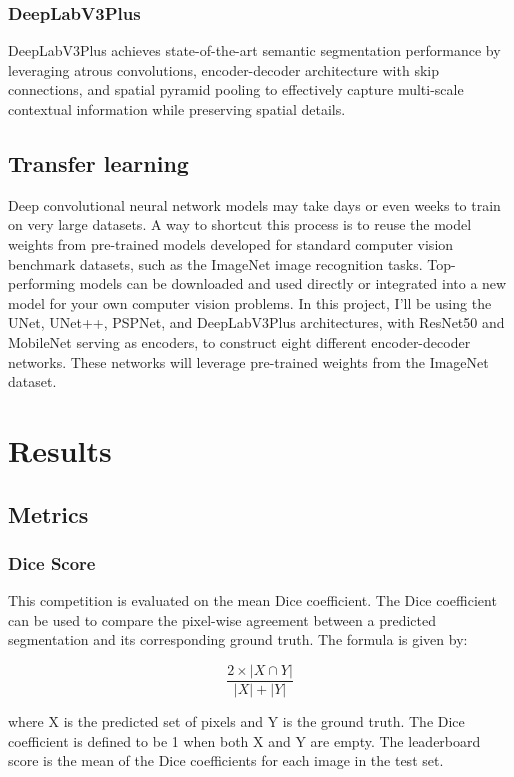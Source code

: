 \documentclass[12pt]{article}
\begin{document}
	\subsubsection{DeepLabV3Plus}	
	DeepLabV3Plus achieves state-of-the-art semantic segmentation performance by leveraging atrous convolutions, encoder-decoder architecture with skip connections, and spatial pyramid pooling to effectively capture multi-scale contextual information while preserving spatial details.
	
	
	\subsection{Transfer learning}
	
	Deep convolutional neural network models may take days or even weeks to train on very large datasets.
A way to shortcut this process is to reuse the model weights from pre-trained models developed for standard computer vision benchmark datasets, such as the ImageNet image recognition tasks. Top-performing models can be downloaded and used directly or integrated into a new model for your own computer vision problems.
In this project, I'll be using the UNet, UNet++, PSPNet, and DeepLabV3Plus architectures, with ResNet50 and MobileNet serving as encoders, to construct eight different encoder-decoder networks. These networks will leverage pre-trained weights from the ImageNet dataset.



	\section{Results}
	\subsection{Metrics}
	
	\subsubsection{Dice Score}
	This competition is evaluated on the mean Dice coefficient. The Dice coefficient can be used to compare the pixel-wise agreement between a predicted segmentation and its corresponding ground truth. The formula is given by:
	
	\begin{equation}
	\frac{2 \times |X \cap Y |}{|X| + |Y|}
	\end{equation}
	
	where X is the predicted set of pixels and Y is the ground truth. The Dice coefficient is defined to be 1 when both X and Y are empty. The leaderboard score is the mean of the Dice coefficients for each image in the test set.
	
\end{document}
